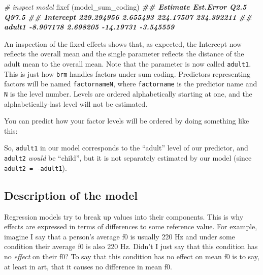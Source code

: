 \documentclass[
]{book}
\newenvironment{Shaded}{\begin{snugshade}}{\end{snugshade}}
\newcommand{\CommentTok}[1]{\textcolor[rgb]{0.56,0.35,0.01}{\textit{#1}}}
\newcommand{\DocumentationTok}[1]{\textcolor[rgb]{0.56,0.35,0.01}{\textbf{\textit{#1}}}}
\newcommand{\FunctionTok}[1]{\textcolor[rgb]{0.00,0.00,0.00}{#1}}
\newcommand{\NormalTok}[1]{#1}
\newcommand{\SpecialCharTok}[1]{\textcolor[rgb]{0.00,0.00,0.00}{#1}}
\begin{document}
\begin{Shaded}
\begin{Highlighting}[]
\CommentTok{\# inspect model}
\FunctionTok{fixef}\NormalTok{ (model\_sum\_coding)}
\DocumentationTok{\#\#             Estimate Est.Error      Q2.5      Q97.5}
\DocumentationTok{\#\# Intercept 229.294956  2.655493 224.17507 234.392211}
\DocumentationTok{\#\# adult1     {-}8.907178  2.698205 {-}14.19731  {-}3.545559}
\end{Highlighting}
\end{Shaded}

An inspection of the fixed effects shows that, as expected, the Intercept now reflects the overall mean and the single parameter reflects the distance of the adult mean to the overall mean. Note that the parameter is now called \texttt{adult1}. This is just how \texttt{brm} handles factors under sum coding. Predictors representing factors will be named \texttt{factornameN}, where \texttt{factorname} is the predictor name and \texttt{N} is the level number. Levels are ordered alphabetically starting at one, and the alphabetically-last level will not be estimated.

You can predict how your factor levels will be ordered by doing something like this:

\begin{Shaded}
\end{Shaded}

So, \texttt{adult1} in our model corresponds to the ``adult'' level of our predictor, and \texttt{adult2} \emph{would} be ``child'', but it is not separately estimated by our model (since \texttt{adult2\ =\ -adult1}).

\hypertarget{description-of-the-model-2}{%
\subsection{Description of the model}\label{description-of-the-model-2}}

Regression models try to break up values into their components. This is why effects are expressed in terms of differences to some reference value. For example, imagine I say that a person's average f0 is usually 220 Hz and under some condition their average f0 is also 220 Hz. Didn't I just say that this condition has no \emph{effect} on their f0? To say that this condition has no effect on mean f0 is to say, at least in art, that it causes no difference in mean f0.
\end{document}
